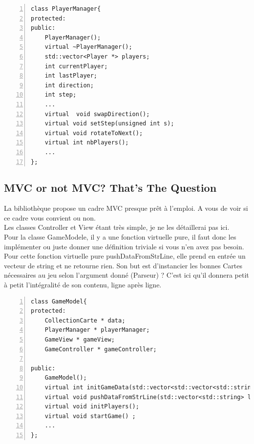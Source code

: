 \documentclass[12pt, letterpaper]{article}
\begin{document}
\begin{Verbatim}[numbers=left,xleftmargin = 5mm]
class PlayerManager{
protected:
public:
    PlayerManager();
    virtual ~PlayerManager();
    std::vector<Player *> players;
    int currentPlayer;
    int lastPlayer;
    int direction;
    int step;
    ...
    virtual  void swapDirection();
    virtual void setStep(unsigned int s);
    virtual void rotateToNext();
    virtual int nbPlayers();
    ...    
};

\end{Verbatim} 


\subsection{MVC or not MVC? That's The Question}

La bibliothèque propose un cadre MVC presque prêt à l'emploi. A vous de voir si ce cadre vous convient ou non.\\
Les classes Controller et View étant très simple, je ne les détaillerai pas ici.\\
Pour la classe GameModele, il y a une fonction virtuelle pure, il faut donc les implémenter ou juste donner une définition triviale si vous n'en avez pas besoin.\\
Pour cette fonction virtuelle pure pushDataFromStrLine, elle prend en entrée un vecteur de string et ne retourne rien.
Son but est d'instancier les bonnes Cartes nécessaires au jeu selon l'argument donné (Parseur) ? 
C'est ici qu'il donnera petit à petit l'intégralité de son contenu, ligne après ligne.\\

\begin{Verbatim}[numbers=left,xleftmargin = 5mm]
class GameModel{
protected:
    CollectionCarte * data;
    PlayerManager * playerManager;
    GameView * gameView;
    GameController * gameController;
    
public:
    GameModel();
    virtual int initGameData(std::vector<std::vector<std::string>> configData);
    virtual void pushDataFromStrLine(std::vector<std::string> line) = 0;
    virtual void initPlayers();
    virtual void startGame() ;
    ...
};
\end{Verbatim} 
\end{document}
